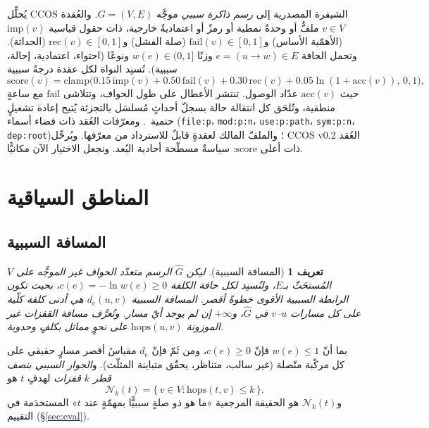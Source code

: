 \documentclass[11pt]{article}
\newtheorem{definition}{تعريف}
\newcommand{\dcausal}{d_{\mathrm{c}}}
\newcommand{\Nk}{\mathcal{N}_k}
\newcommand{\code}[1]{\textenglish{\texttt{#1}}}
\begin{document}
يُحلِّل CCOS الشيفرة المصدرية إلى \emph{رسم ذاكرة سببي} موجَّه $G=(V,E)$. والعُقدة $v\in V$
ملفٌّ أو وحدةٌ نمطية أو رمزٌ أو اعتماديةٌ خارجية، ذات حقول قياسية $\mathrm{imp}(v)$
(الأهمّية الأساس) و$\mathrm{fail}(v)\in[0,1]$ (صلة الفشل) و$\mathrm{rec}(v)\in[0,1]$
(الحداثة). وتحمل الحافة $e=(u\!\to\!w)\in E$ وزنًا $w(e)\in(0,1]$ ونوعًا (احتواء،
اعتمادية، إحالة، سببية). تُسنِد النواة لكل عقدة درجةً سببية
\begin{equation}
\mathrm{score}(v) = \mathrm{clamp}\big(0.15\,\mathrm{imp}(v) + 0.50\,\mathrm{fail}(v)
  + 0.30\,\mathrm{rec}(v) + 0.05\ln(1{+}\mathrm{acc}(v)),\,0,1\big),
\label{eq:score}
\end{equation}
حيث $\mathrm{acc}(v)$ عدّاد الوصول. تنتشر الأعطال على طول الحواف، وتتلاشى $\mathrm{fail}$
مع ساعةٍ منطقية، وتُلحَق كل انتقالة حالة بسجلّ أحداثٍ مُسلسَل بالتجزئة يُتيح إعادة تشغيلٍ
حتمية~\cite{haber1991timestamp}. ومعرّفات العُقد ذات فضاء أسماء (\code{file:p}،
\code{mod:p:n}، \code{use:p:path}، \code{sym:p:n}، \code{dep:root})؛ والملفّ المالك لعقدةٍ
قابلٌ للاسترداد من معرّفها. ويُرحِّل CCOS v0.2 العُقد ذات أعلى $\mathrm{score}$: سياسةٌ
مسطّحة أحادية البُعد. ونجعل الاختيار الآن مكانيًّا.

\section{المناطق السياقية}\label{sec:regions}

\subsection{المسافة السببية}

\begin{definition}[المسافة السببية]
ليكن $\hat G$ الرسم متعدّد الحواف غير الموجَّه على $V$ المُستحَثّ بـ$E$، ولنُسنِد لكل حافة
الكلفة $c(e) = -\ln w(e) \ge 0$، بحيث تكون الرابطة السببية الأقوى خطوةً أقصر.
\emph{المسافة السببية} $\dcausal(u,v)$ هي أدنى كلفة كلّية على كل مسارات $u$--$v$ في
$\hat G$، و$+\infty$ إن لم يوجد أيّ مسار. وتُعرَّف مسافة القفزات غير الموزونة
$\mathrm{hops}(u,v)$ على نحوٍ مماثل بكلفٍ وحدوية.
\end{definition}

بما أنّ $w(e)\le 1$ فإنّ $c(e)\ge 0$، ومن ثَمّ فإنّ $\dcausal$ مقياسُ أقصر مسارٍ حقيقي على
كل مركّبة متّصلة (غير سالب، متناظر، يحقّق متباينة المثلّث). و\emph{الجوار السببي بنصف قطر
$k$ قفزات} لهدفٍ $t$ هو
\begin{equation}
\Nk(t) = \{\, v \in V : \mathrm{hops}(t,v) \le k \,\}.
\end{equation}
و$\Nk(t)$ هو الحقيقة المرجعية «ما هو ذو صلةٍ سببيًّا بمهمّةٍ عند $t$» المستخدَمة في التقييم
(\S\ref{sec:eval}).
\end{document}
